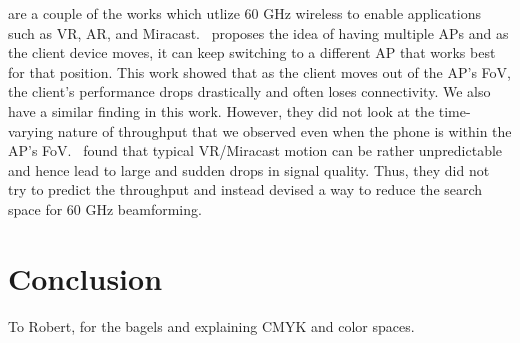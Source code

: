 \documentclass[sigconf,anonymous]{acmart}
\begin{document}
\cite{wei:mobicom2017,zhou:infocom2018} are a couple of the works which utlize 60 GHz wireless to enable applications such as VR, AR, and Miracast.~\cite{wei:mobicom2017} proposes the idea of having multiple APs and as the client device moves, it can keep switching to a different AP that works best for that position. This work showed that as the client moves out of the AP's FoV, the client's performance drops drastically and often loses connectivity. We also have a similar finding in this work. However, they did not look at the time-varying nature of throughput that we observed even when the phone is within the AP's FoV.~\cite{zhou:infocom2018} found that typical VR/Miracast motion can be rather unpredictable and hence lead to large and sudden drops in signal quality. Thus, they did not try to predict the throughput and instead devised a way to reduce the search space for 60 GHz beamforming.

\section{Conclusion}



\begin{acks}
To Robert, for the bagels and explaining CMYK and color spaces.
\end{acks}






\end{document}
